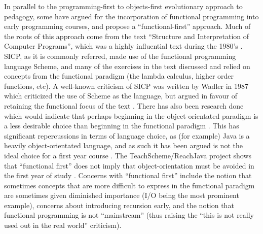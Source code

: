 In parallel to the programming-first to objects-first evolutionary approach to pedagogy, some have argued for the incorporation of functional programming into early programming courses, and propose a ``functional-first'' approach.  Much of the roots of this approach come from the text ``Structure and Interpretation of Computer Programs''\cite{SICPbook}, which was a highly influential text during the 1980's \cite{Flatt04}.  SICP, as it is commonly referred, made use of the functional programming language Scheme, and many of the exercises in the text discussed and relied on concepts from the functional paradigm (the lambda calculus, higher order functions, etc).  A well-known criticism of SICP was written by Wadler in 1987 which criticized the use of Scheme as the language, but argued in favour of retaining the functional focus of the text \cite{Wadler87}.  There has also been research done which would indicate that perhaps beginning in the object-orientated paradigm is a less desirable choice than beginning in the functional paradigm \cite{Huch05,Flatt04}.  This has significant repercussions in terms of language choice, as (for example) Java is a heavily object-orientated language, and as such it has been argued is not the ideal choice for a first year course \cite{Huch05,Bos98}.  The TeachScheme/ReachJava project shows that ``functional first'' does not imply that object-orientation must be avoided in the first year of study \cite{Bloch08,teachScheme,Felleisen04}.  Concerns with ``functional first'' include the notion that sometimes concepts that are more difficult to express in the functional paradigm are sometimes given diminished importance (I/O being the most prominent example), concerns about introducing recursion early, and the notion that functional programming is not ``mainstream'' (thus raising the ``this is not really used out in the real world'' criticism)\cite{Chakravarty04}.

